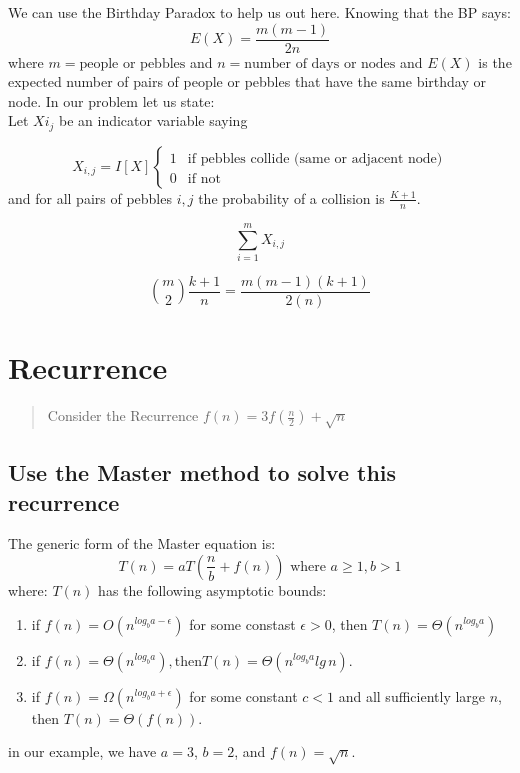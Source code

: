 \documentclass[titlepage]{article}\usepackage[]{graphicx}\usepackage[]{color}
\begin{document}
We can use the Birthday Paradox to help us out here. Knowing that the BP says:
\[ E(X) = \frac{m(m-1)}{2n} \]
where $m = \text{people or pebbles}$ and $n = \text{number of days or nodes}$
and $E(X)$ is the expected number of pairs of people or pebbles that have the
same birthday or node. In our problem let us state:\\

Let $X{i_j}$ be an indicator variable saying 

\[
	X_{i,j} = I[X]
	\begin{cases}
		1 & \text{if pebbles collide (same or adjacent node)} \\
		0 & \text{if not } 
	\end{cases}
\]
and for all pairs of pebbles $i,j$ the probability of a collision is
$\frac{K+1}{n}$.


\[ \sum_{i=1}^{m} X_{i,j} \] 

\[ {m \choose 2} \frac{k+1}{n} = \frac{m(m-1)(k+1)}{2(n)} \]



\section{Recurrence}

\begin{quote}
	Consider the Recurrence $f(n) = 3f(\frac{n}{2}) + \sqrt{n}$
\end{quote}

\subsection{Use the Master method to solve this recurrence}
The generic form of the Master equation is:
\[ T(n) = aT\left(\frac{n}{b} + f(n)\right) \text{ where } a\geq 1, b> 1 \]
where:
$T(n)$ has the following asymptotic bounds:
\begin{enumerate}
	\item if $f(n) = O\left(n^{log_b a-\epsilon}\right)$ for some constast
		$\epsilon > 0$, then $T(n) = \Theta(n^{log_b a})$
	\item if $f(n) = \Theta(n^{log_b a}), \text{then} T(n) =
		\Theta\left(n^{log_b a} lg\,n\right)$. 
	\item if $f(n) = \Omega\left(n^{log_b a + \epsilon}\right)$ for some
		constant $c < 1$ and all sufficiently large $n$, then $T(n) =
		\Theta(f(n))$. 
\end{enumerate}

in our example, we have $a = 3$, $b = 2$, and $f(n) = \sqrt{n}$. 
\end{document}
